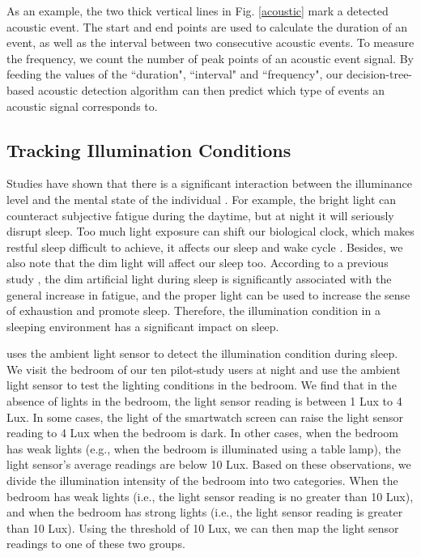  As an example, the two thick vertical lines in Fig. \ref{acoustic} mark a detected acoustic event. The start and end
points are used to calculate the duration of an event, as well as the interval between two consecutive acoustic events. To measure the
frequency, we count the number of peak points of an acoustic event signal. By feeding the values of the ``duration", ``interval" and
``frequency", our decision-tree-based acoustic detection algorithm can then predict which type of events an acoustic signal corresponds to.



\subsection{Tracking Illumination Conditions \label{sec:illumination}}
Studies have shown that there is a significant interaction between the illuminance level and the mental state of the individual
\cite{light77}. For example, the bright light can counteract subjective fatigue during the daytime, but at night it will seriously disrupt
sleep. Too much light exposure can shift our biological clock, which makes restful sleep difficult to achieve, it affects our sleep and
wake cycle \cite{light2007}.  Besides, we also note that the dim light will affect our sleep too. According to a previous study
\cite{light2016}, the dim artificial light during sleep is significantly associated with the general increase in fatigue, and the proper
light can be used to increase the sense of exhaustion and promote sleep. Therefore, the illumination condition in a sleeping environment
has a significant impact on sleep.

{\systemname} uses the ambient light sensor to detect the illumination condition during sleep. We visit the bedroom of our ten pilot-study
users at night and use the ambient light sensor to test the lighting conditions in the bedroom. We find that in the absence of lights in
the bedroom, the light sensor reading is between 1 Lux to 4 Lux. In some cases, the light of the smartwatch screen can raise the light
sensor reading to 4 Lux when the bedroom is dark. In other cases, when the bedroom has weak lights (e.g., when the bedroom is illuminated
using a table lamp), the light sensor's average readings are below 10 Lux. Based on these observations, we divide the illumination
intensity of the bedroom into two categories. When the bedroom has weak lights (i.e., the light sensor reading is no greater than 10 Lux),
and when the bedroom has strong lights (i.e., the light sensor reading is greater than 10 Lux). Using the threshold of 10 Lux, we can then
map the light sensor readings to one of these two groups.


